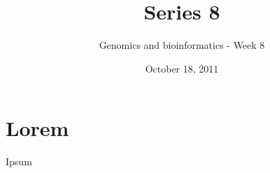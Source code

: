 \documentclass[a4paper,11pt]{article}
\title{Series 8}
\date{October 18, 2011}
\author{Genomics and bioinformatics - Week 8}
\begin{document}
\maketitle

\section{Lorem}
Ipsum
\end{document}
